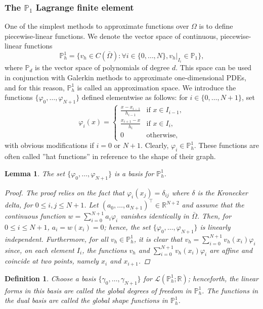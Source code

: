 \documentclass{article}
\newtheorem{definition}{Definition}
\newtheorem{lemma}{Lemma}
\begin{document}
\subsubsection{The $\mathbb{P}_1$ Lagrange finite element}
One of the simplest methods to approximate functions over $\Omega$ is to define piecewise-linear functions. We denote the vector space of continuous, piecewise-linear functions
$$ \mathbb{P}_h^1 = \{ v_h \in C(\bar{\Omega}): \forall i \in \{0, \dots, N\}, v_h|_{I_i} \in \mathbb{P}_1 \},$$
where $\mathbb{P}_d$ is the vector space of polynomials of degree $d$. This space can be used in conjunction with Galerkin methods to approximate one-dimensional PDEs, and for this reason, $\mathbb{P}_h^1$ is called an approximation space.
We introduce the functions $\{\varphi_0, \dots, \varphi_{N+1}\}$ defined elementwise as follows: for $i \in \{0, \dots, N+1\}$, set
$$ \varphi_i(x) = \begin{cases} \frac{x - x_{i-1}}{h_{i-1}} & \text{if } x \in I_{i-1}, \\ \frac{x_{i+1} - x}{h_i} & \text{if } x \in I_i, \\ 0 & \text{otherwise}, \end{cases} $$
with obvious modifications if $i = 0$ or $N+1$. Clearly, $\varphi_i \in \mathbb{P}_h^1$. These functions are often called ''hat functions'' in reference to the shape of their graph.
\begin{lemma} \label{hatbasis}
    The set $\{\varphi_0, \dots, \varphi_{N+1}\}$ is a basis for $\mathbb{P}_h^1$.
    \begin{proof}
        The proof relies on the fact that $\varphi_i(x_j) = \delta_{ij}$ where $\delta$ is the Kronecker delta, for $0 \le i,j \le N+1$. Let $(a_0, \dots, a_{N+1})^\top \in \mathbb{R}^{N+2}$ and assume that the continuous function $w = \sum_{i=0}^{N+1} a_i \varphi_i$ vanishes identically in $\bar{\Omega}$. Then, for $0 \le i \le N+1$, $a_i = w(x_i) = 0$; hence, the set $\{\varphi_0, \dots, \varphi_{N+1}\}$ is linearly independent. Furthermore, for all $v_h \in \mathbb{P}_h^1$, it is clear that $v_h = \sum_{i=0}^{N+1} v_h(x_i) \varphi_i$ since, on each element $I_i$, the functions $v_h$ and $\sum_{i=0}^{N+1} v_h(x_i) \varphi_i$ are affine and coincide at two points, namely $x_i$ and $x_{i+1}$.
    \end{proof}
\end{lemma}
\begin{definition}
    Choose a basis $\{\gamma_0, \dots, \gamma_{N+1}\}$ for $\mathcal{L}(\mathbb{P}_h^1;\mathbb{R})$; henceforth, the linear forms in this basis are called the global degrees of freedom in $\mathbb{P}_h^1$. The functions in the dual basis are called the global shape functions in $\mathbb{P}_h^1$. 
\end{definition}
\end{document}
